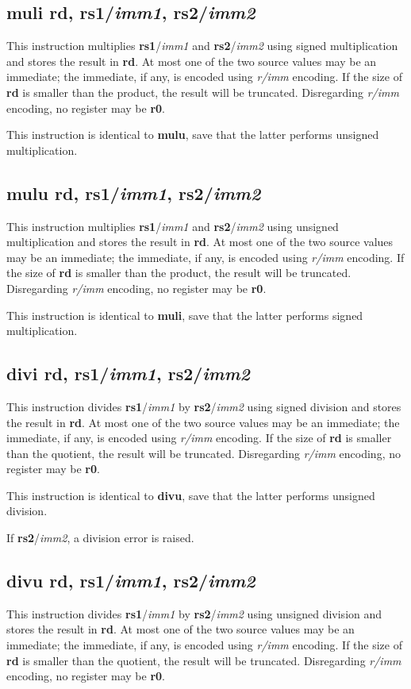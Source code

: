 \documentclass[12pt, a4paper, oneside, final]{article}
\def\i#1{\textcolor{icolour}{\bfseries#1}}
\def\r#1{\textcolor{rcolour}{\bfseries r#1}}
\begin{document}
\subsection{\i{muli} \r{d}, \r{s1}/\textit{imm1}, \r{s2}/\textit{imm2}}
This instruction multiplies \r{s1}/\textit{imm1} and \r{s2}/\textit{imm2} using signed
multiplication and stores the result in \r{d}. At most one of the two source values may be an
immediate; the immediate, if any, is encoded using \textit{r/imm} encoding. If the size of \r{d} is
smaller than the product, the result will be truncated. Disregarding \textit{r/imm} encoding, no
register may be \r{0}.

This instruction is identical to \i{mulu}, save that the latter performs unsigned multiplication.

\subsection{\i{mulu} \r{d}, \r{s1}/\textit{imm1}, \r{s2}/\textit{imm2}}
This instruction multiplies \r{s1}/\textit{imm1} and \r{s2}/\textit{imm2} using unsigned
multiplication and stores the result in \r{d}. At most one of the two source values may be an
immediate; the immediate, if any, is encoded using \textit{r/imm} encoding. If the size of \r{d} is
smaller than the product, the result will be truncated. Disregarding \textit{r/imm} encoding, no
register may be \r{0}.

This instruction is identical to \i{muli}, save that the latter performs signed multiplication.

\subsection{\i{divi} \r{d}, \r{s1}/\textit{imm1}, \r{s2}/\textit{imm2}}
This instruction divides \r{s1}/\textit{imm1} by \r{s2}/\textit{imm2} using signed division and
stores the result in \r{d}. At most one of the two source values may be an immediate; the immediate,
if any, is encoded using \textit{r/imm} encoding. If the size of \r{d} is smaller than the quotient,
the result will be truncated. Disregarding \textit{r/imm} encoding, no register may be \r{0}.

This instruction is identical to \i{divu}, save that the latter performs unsigned division.

If \r{s2}/\textit{imm2}, a division error is raised.

\subsection{\i{divu} \r{d}, \r{s1}/\textit{imm1}, \r{s2}/\textit{imm2}}
This instruction divides \r{s1}/\textit{imm1} by \r{s2}/\textit{imm2} using unsigned division and
stores the result in \r{d}. At most one of the two source values may be an immediate; the immediate,
if any, is encoded using \textit{r/imm} encoding. If the size of \r{d} is smaller than the quotient,
the result will be truncated. Disregarding \textit{r/imm} encoding, no register may be \r{0}.
\end{document}
